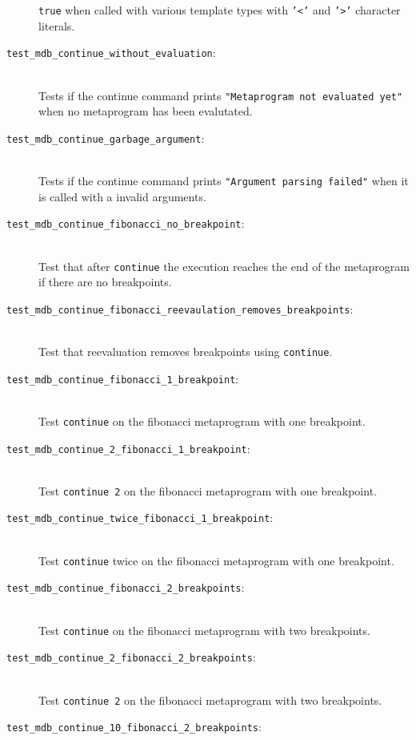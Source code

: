 \begin{description}
        \texttt{true} when called with various template types with
        \texttt{'<'} and \texttt{'>'} character literals.
    \item[\texttt{test\_mdb\_continue\_without\_evaluation}:] \hfill \\
        Tests if the continue command prints
        \texttt{"Metaprogram not evaluated yet"} when no metaprogram has been
        evalutated.
    \item[\texttt{test\_mdb\_continue\_garbage\_argument}:] \hfill \\
        Tests if the continue command prints
        \texttt{"Argument parsing failed"} when it is called with a invalid
        arguments.
    \item[\texttt{test\_mdb\_continue\_fibonacci\_no\_breakpoint}:] \hfill \\
        Test that after \texttt{continue} the execution reaches the end of the
        metaprogram if there are no breakpoints.
    \item[\texttt{test\_mdb\_continue\_fibonacci\_reevaulation\_removes\_breakpoints}:] \hfill \\
        Test that reevaluation removes breakpoints using \texttt{continue}.
    \item[\texttt{test\_mdb\_continue\_fibonacci\_1\_breakpoint}:] \hfill \\
        Test \texttt{continue} on the fibonacci metaprogram with one
        breakpoint.
    \item[\texttt{test\_mdb\_continue\_2\_fibonacci\_1\_breakpoint}:] \hfill \\
        Test \texttt{continue 2} on the fibonacci metaprogram with one
        breakpoint.
    \item[\texttt{test\_mdb\_continue\_twice\_fibonacci\_1\_breakpoint}:] \hfill \\
        Test \texttt{continue} twice on the fibonacci metaprogram with one
        breakpoint.
    \item[\texttt{test\_mdb\_continue\_fibonacci\_2\_breakpoints}:] \hfill \\
        Test \texttt{continue} on the fibonacci metaprogram with two
        breakpoints.
    \item[\texttt{test\_mdb\_continue\_2\_fibonacci\_2\_breakpoints}:] \hfill \\
        Test \texttt{continue 2} on the fibonacci metaprogram with two
        breakpoints.
    \item[\texttt{test\_mdb\_continue\_10\_fibonacci\_2\_breakpoints}:] \hfill \\

\end{description}
